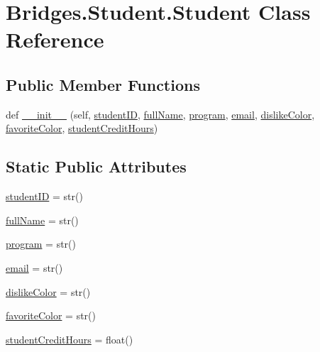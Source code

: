 \hypertarget{class_bridges_1_1_student_1_1_student}{}\section{Bridges.\+Student.\+Student Class Reference}
\label{class_bridges_1_1_student_1_1_student}
\subsection*{Public Member Functions}
\begin{DoxyCompactItemize}
\item 
def \mbox{\hyperlink{class_bridges_1_1_student_1_1_student_aa275891c43b2559f768987954c81ddc3}{\+\_\+\+\_\+init\+\_\+\+\_\+}} (self, \mbox{\hyperlink{class_bridges_1_1_student_1_1_student_a2d819e6c57cca2531ceb07758f3c68ca}{student\+ID}}, \mbox{\hyperlink{class_bridges_1_1_student_1_1_student_ada26e59fd4a1d226b6e20fc56b7648b0}{full\+Name}}, \mbox{\hyperlink{class_bridges_1_1_student_1_1_student_ac3aa33f5fd7fa090cba94c5f984fa9f8}{program}}, \mbox{\hyperlink{class_bridges_1_1_student_1_1_student_ab415f4256531a525c25d5a488ebac289}{email}}, \mbox{\hyperlink{class_bridges_1_1_student_1_1_student_a396e3211e374055100f49e19fb76e266}{dislike\+Color}}, \mbox{\hyperlink{class_bridges_1_1_student_1_1_student_ab14eca60ed0a69c4fe7cb411cc808ef6}{favorite\+Color}}, \mbox{\hyperlink{class_bridges_1_1_student_1_1_student_af5a334e9e2ad9aaa354c420721d67313}{student\+Credit\+Hours}})
\end{DoxyCompactItemize}
\subsection*{Static Public Attributes}
\begin{DoxyCompactItemize}
\item 
\mbox{\hyperlink{class_bridges_1_1_student_1_1_student_a2d819e6c57cca2531ceb07758f3c68ca}{student\+ID}} = str()
\item 
\mbox{\hyperlink{class_bridges_1_1_student_1_1_student_ada26e59fd4a1d226b6e20fc56b7648b0}{full\+Name}} = str()
\item 
\mbox{\hyperlink{class_bridges_1_1_student_1_1_student_ac3aa33f5fd7fa090cba94c5f984fa9f8}{program}} = str()
\item 
\mbox{\hyperlink{class_bridges_1_1_student_1_1_student_ab415f4256531a525c25d5a488ebac289}{email}} = str()
\item 
\mbox{\hyperlink{class_bridges_1_1_student_1_1_student_a396e3211e374055100f49e19fb76e266}{dislike\+Color}} = str()
\item 
\mbox{\hyperlink{class_bridges_1_1_student_1_1_student_ab14eca60ed0a69c4fe7cb411cc808ef6}{favorite\+Color}} = str()
\item 
\mbox{\hyperlink{class_bridges_1_1_student_1_1_student_af5a334e9e2ad9aaa354c420721d67313}{student\+Credit\+Hours}} = float()
\end{DoxyCompactItemize}


